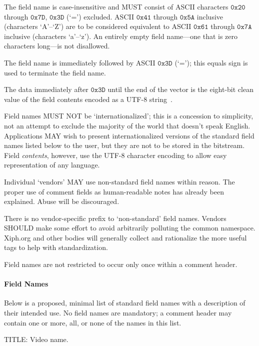 \documentclass[9pt,letterpaper]{book}
\newcommand{\hex}[1]{\ensuremath{\mathtt{0x#1}}}
\numberwithin{equation}{chapter}
\numberwithin{figure}{chapter}
\numberwithin{table}{chapter}
\begin{document}
The field name is case-insensitive and MUST consist of ASCII characters
 \hex{20} through \hex{7D}, \hex{3D} (`=') excluded.
ASCII \hex{41} through \hex{5A} inclusive (characters `A'--`Z') are to be
 considered equivalent to ASCII \hex{61} through \hex{7A} inclusive
 (characters `a'--`z').
An entirely empty field name---one that is zero characters long---is not
 disallowed.

The field name is immediately followed by ASCII \hex{3D} (`='); this equals
 sign is used to terminate the field name.

The data immediately after \hex{3D} until the end of the vector is the eight-bit
 clean value of the field contents encoded as a UTF-8 string~\cite{rfc2044}.

Field names MUST NOT be `internationalized'; this is a concession to
 simplicity, not an attempt to exclude the majority of the world that doesn't
 speak English.
Applications MAY wish to present internationalized versions of the standard
 field names listed below to the user, but they are not to be stored in the
 bitstream.
Field {\em contents}, however, use the UTF-8 character encoding to allow easy
 representation of any language.

Individual `vendors' MAY use non-standard field names within reason.
The proper use of comment fields as human-readable notes has already been
 explained.
Abuse will be discouraged.

There is no vendor-specific prefix to `non-standard' field names.
Vendors SHOULD make some effort to avoid arbitrarily polluting the common
 namespace.
Xiph.org and other bodies will generally collect and rationalize the more 
 useful tags to help with standardization.

Field names are not restricted to occur only once within a comment header.

\paragraph{Field Names}

Below is a proposed, minimal list of standard field names with a description of
 their intended use.
No field names are mandatory; a comment header may contain one or more, all, or
 none of the names in this list.

\begin{description}
\item{TITLE:} Video name.
\end{description}
\end{document}
